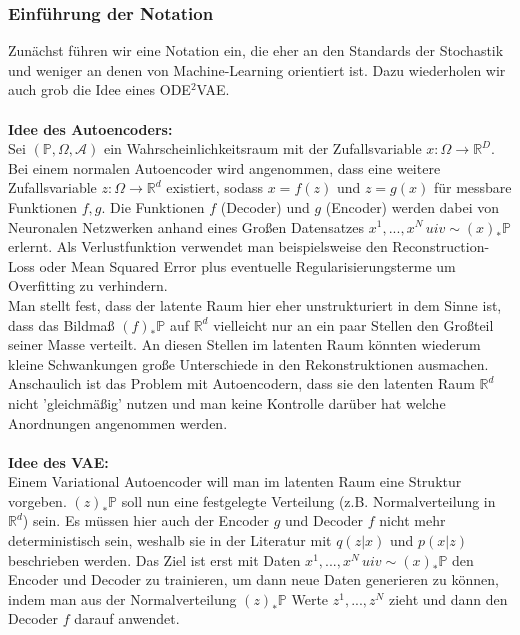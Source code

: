 \documentclass[12pt]{article}
\newcommand{\R}{\mathbb{R}}
\newcommand{\bP}{\mathbb{P}}
\begin{document}
	\subsubsection[Notation]{Einführung der Notation}
	Zunächst führen wir eine Notation ein, die eher an den Standards der Stochastik und weniger an denen von Machine-Learning orientiert ist. Dazu wiederholen wir auch grob die Idee eines ODE$^2$VAE.\\
	\\
	\textbf{Idee des Autoencoders:}\\
	Sei $(\bP,\Omega,\mathcal{A})$ ein Wahrscheinlichkeitsraum mit der Zufallsvariable $x : \Omega \rightarrow \R^D$. Bei einem normalen Autoencoder wird angenommen, dass eine weitere Zufallsvariable $z: \Omega \rightarrow \R^d$ existiert, sodass $x = f(z)$ und $z = g(x)$ für messbare Funktionen $f,g$. Die Funktionen $f$ (Decoder) und $g$ (Encoder) werden dabei von Neuronalen Netzwerken anhand eines Großen Datensatzes $x^1,...,x^N \, uiv \sim (x)_*\bP$ erlernt. Als Verlustfunktion verwendet man beispielsweise den Reconstruction-Loss oder Mean Squared Error plus eventuelle Regularisierungsterme um Overfitting zu verhindern.\\
	Man stellt fest, dass der latente Raum hier eher unstrukturiert in dem Sinne ist, dass das Bildmaß $(f)_*\bP$ auf $\R^d$ vielleicht nur an ein paar Stellen den Großteil seiner Masse verteilt. An diesen Stellen im latenten Raum könnten wiederum kleine Schwankungen große Unterschiede in den Rekonstruktionen ausmachen. Anschaulich ist das Problem mit Autoencodern, dass sie den latenten Raum $\R^d$ nicht 'gleichmäßig' nutzen und man keine Kontrolle darüber hat welche Anordnungen angenommen werden.\\
	\\
	\textbf{Idee des VAE:}\\
	Einem Variational Autoencoder will man im latenten Raum eine Struktur vorgeben. $(z)_*\bP$ soll nun eine festgelegte Verteilung (z.B. Normalverteilung in $\R^d$) sein. Es müssen hier auch der Encoder $g$ und Decoder $f$ nicht mehr deterministisch sein, weshalb sie in der Literatur mit $q(z|x)$ und $p(x|z)$ beschrieben werden. Das Ziel ist erst mit Daten $x^1,...,x^N \, uiv \sim (x)_*\bP$ den Encoder und Decoder zu trainieren, um dann neue Daten generieren zu können, indem man aus der Normalverteilung $(z)_*\bP$ Werte $z^1,...,z^N$ zieht und dann den Decoder $f$ darauf anwendet.\\
\end{document}
